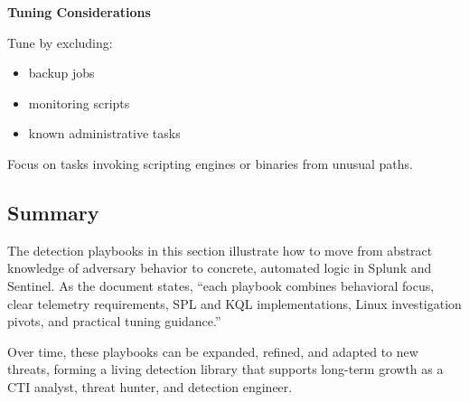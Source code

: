 \textbf{Tuning Considerations}

Tune by excluding:

\begin{itemize}
    \item backup jobs
    \item monitoring scripts
    \item known administrative tasks
\end{itemize}

Focus on tasks invoking scripting engines or binaries from unusual paths.


\subsection*{Summary}

The detection playbooks in this section illustrate how to move from abstract knowledge of adversary behavior to concrete, 
automated logic in Splunk and Sentinel. As the document states, “each playbook combines behavioral focus, clear telemetry 
requirements, SPL and KQL implementations, Linux investigation pivots, and practical tuning guidance.” 

Over time, these playbooks can be expanded, refined, and adapted to new threats, forming a living detection library that 
supports long-term growth as a CTI analyst, threat hunter, and detection engineer.
